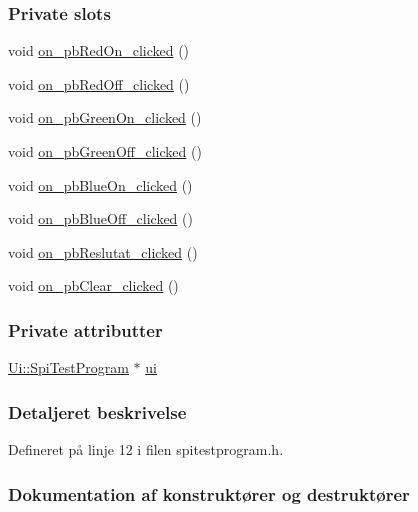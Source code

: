 \subsubsection*{Private slots}
\begin{DoxyCompactItemize}
\item 
void \hyperlink{class_spi_test_program_acd8877e279a4f79d7300588b9628bf90}{on\+\_\+pb\+Red\+On\+\_\+clicked} ()
\item 
void \hyperlink{class_spi_test_program_a79cfbfe880f6360ab788d2dc97853d0e}{on\+\_\+pb\+Red\+Off\+\_\+clicked} ()
\item 
void \hyperlink{class_spi_test_program_aa852cac65b64df0aac74a4b95b59a62e}{on\+\_\+pb\+Green\+On\+\_\+clicked} ()
\item 
void \hyperlink{class_spi_test_program_a4b93d87c6f8a6e8eb56f69c0326906af}{on\+\_\+pb\+Green\+Off\+\_\+clicked} ()
\item 
void \hyperlink{class_spi_test_program_ac575e89a52cd7dbeb68a4f5fa4926374}{on\+\_\+pb\+Blue\+On\+\_\+clicked} ()
\item 
void \hyperlink{class_spi_test_program_ada4246a223bc5273c0c53cd993203932}{on\+\_\+pb\+Blue\+Off\+\_\+clicked} ()
\item 
void \hyperlink{class_spi_test_program_acc0c70df85267b31e29c790ca2806895}{on\+\_\+pb\+Reslutat\+\_\+clicked} ()
\item 
void \hyperlink{class_spi_test_program_a5ca1e8292a9ae7b699e6395619650a95}{on\+\_\+pb\+Clear\+\_\+clicked} ()
\end{DoxyCompactItemize}
\subsubsection*{Private attributter}
\begin{DoxyCompactItemize}
\item 
\hyperlink{class_ui_1_1_spi_test_program}{Ui\+::\+Spi\+Test\+Program} $\ast$ \hyperlink{class_spi_test_program_aeb2a16d7ad7ec0f4e767355e60efcf05}{ui}
\end{DoxyCompactItemize}


\subsubsection{Detaljeret beskrivelse}


Defineret på linje 12 i filen spitestprogram.\+h.



\subsubsection{Dokumentation af konstruktører og destruktører}
